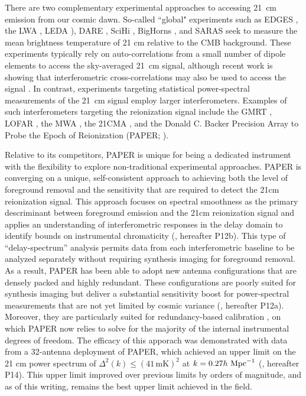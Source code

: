 \documentclass[twocolumn,numberedappendix]{emulateapj} \shorttitle{PSA64}
\begin{document}
There are two complementary experimental approaches to accessing 21~cm emission from
our cosmic dawn.  So-called ``global" experiments such as 
EDGES \citep{bowman_et_al2010}, 
the LWA \citep{ellingson_et_al2013},
LEDA \citep{greenhill_bernardi2012}), 
DARE \citep{burns_et_al2012}, 
SciHi \cite{tabitha_et_al2014}, 
BigHorns \citep{sokolowski_et_al2015},
and SARAS \citep{patra_et_al2015} 
seek to measure the
mean brightness temperature of 21 cm relative to the CMB background. These experiments
typically rely on auto-correlations from a small number of dipole elements to access
the sky-averaged 21~cm signal, although recent work is showing
that interferometric cross-correlations may also be used to access the signal
\citep{presley_et_al2015,vedantham_et_al2015}.
In contrast, experiments targeting statistical power-spectral measurements of the 21~cm
signal employ larger interferometers.  Examples of such interferometers targeting
the reionization signal include
the GMRT \citep{paciga_et_al2013},
LOFAR \citep{van_haarlem_et_al2013},
the MWA \citep{tingay_et_al2013},
the 21CMA \citep{peterson_et_al2004,wu2009},
and the Donald C. Backer Precision Array to Probe the Epoch of Reionization (PAPER; \citealt{parsons_et_al2010}). 

Relative to its competitors, PAPER is unique for being a dedicated instrument with the flexibility
to explore non-traditional experimental approaches.  PAPER is converging on a unique, self-consistent
approach to achieving both the level of foreground removal and the sensitivity that are required 
to detect the 21cm reionization signal.  This approach focuses on spectral smoothness as the primary
descriminant between foreground emission and the 21cm reionization signal  and applies an understanding
of interferometric responses in the delay domain to identify bounds on instrumental chromaticity 
(\citealt{parsons_et_al2012b}, hereafter P12b).  This type of ``delay-spectrum'' analysis permits data from each 
interferometric baseline
to be analyzed separately without requiring synthesis imaging for foreground removal.  As a result, PAPER has
been able to adopt new antenna configurations that are densely packed and highly redundant.
These configurations are poorly suited for synthesis imaging but
deliver a substantial sensitivity boost for power-spectral measurements that are not yet limited by
cosmic variance (\citealt{parsons_et_al2012a}, hereafter P12a).  Moreover, they are particularly suited
for redundancy-based calibration \citep{liu_et_al2010,wieringa1992,zheng_et_al2014}, on which PAPER
now relies to solve for the majority of the internal instrumental degrees of freedom.  The efficacy of
this apporach was demonstrated with 
data from a 32-antenna deployment of PAPER, which achieved an upper 
limit on the 21 cm power spectrum of $\Delta^2 (k) \leq (41\,\textrm{mK})^{2}$ at 
$k=0.27 h\ {\rm Mpc}^{-1}$ (\citealt{parsons_et_al2014}, hereafter P14).  This upper limit improved
over previous limits by orders of magnitude, and as of this writing, remains the best
upper limit achieved in the field.
\end{document}
